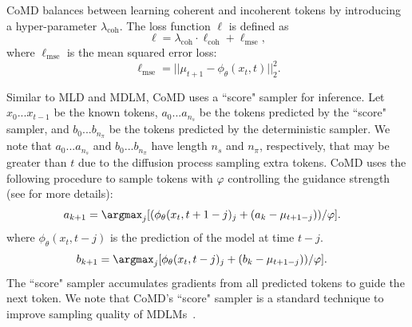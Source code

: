 CoMD balances between learning coherent and incoherent tokens by introducing a hyper-parameter $\lambda_\mathrm{coh}$. The loss function $\ell$ is defined as
\begin{equation}
    \ell = \lambda_\mathrm{coh}\cdot \ell_{\mathrm{coh}} + \ell_\mathrm{mse}, 
\end{equation}
where $\ell_{\mathrm{mse}}$ is the mean squared error loss: 
\begin{equation}
    \ell_{\mathrm{mse}} = ||\mu_{t+1} - \phi_\theta(x_t, t)||_2^2.
\end{equation}

Similar to MLD and MDLM, CoMD uses a ``score" sampler for inference. Let $x_0...x_{t-1}$ be the known tokens, $a_0...a_{n_s}$ be the tokens predicted by the ``score" sampler, and $b_0...b_{n_\pi}$ be the tokens predicted by the deterministic sampler. We note that $a_0...a_{n_s}$ and $b_0...b_{n_\pi}$ have length $n_s$ and $n_\pi$, respectively, that may be greater than $t$ due to the diffusion process sampling extra tokens. CoMD uses the following procedure to sample tokens with $\varphi$ controlling the guidance strength (see \citet{austin2023structured} for more details):
\begin{align}
    a_{k+1} &= \argmax_{j}[(\phi_\theta(x_{t}, t+1-j)_{j}+(a_{k} - \mu_{t+1-j}))/\varphi]. \label{eq:acall_accumulate}
\end{align}
where $\phi_\theta(x_{t}, t-j)$ is the prediction of the model at time $t-j$.
\begin{align}
    b_{k+1} &= \argmax_{j}[\phi_\theta(x_{t}, t-j)_j+ (b_k-\mu_{t+1-j}))/\varphi]. \label{eq:bcall_accumulate}
\end{align}
The ``score" sampler accumulates gradients from all predicted tokens to guide the next token. We note that CoMD's ``score" sampler is a standard technique to improve sampling quality of MDLMs~\citep{austin2023structured}.
